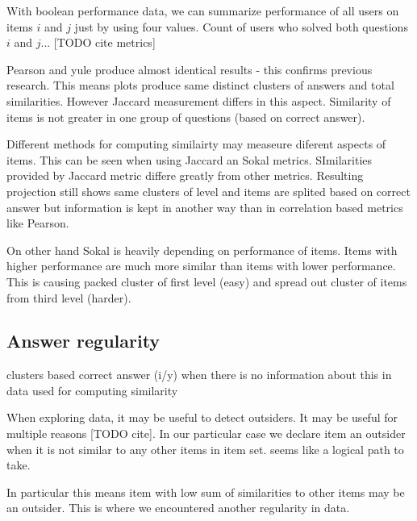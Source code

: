 \documentclass[
  digital, %
  table,   %
  nolof,     %
  nolot,     %
  nocover
]{fithesis3}
\begin{document}

With boolean performance data, we can summarize performance of all users on items $i$ and $j$ just by using four values. Count of users who solved both questions $i$ and $j$... [TODO cite metrics]

Pearson and yule produce almost identical results - this confirms
previous research. This means plots produce same distinct clusters of
answers and total similarities. However Jaccard measurement differs in
this aspect. Similarity of items is not greater in one group of
questions (based on correct answer).

Different methods for computing similairty may measeure diferent aspects
of items. This can be seen when using Jaccard an Sokal metrics.
SImilarities provided by Jaccard metric differe greatly from other
metrics. Resulting projection still shows same clusters of level and
items are splited based on correct answer but information is kept in
another way than in correlation based metrics like Pearson.

On other hand Sokal is heavily depending on performance of items. Items
with higher performance are much more similar than items with lower
performance. This is causing packed cluster of first level (easy) and
spread out cluster of items from third level (harder).


\subsection{Answer regularity}\label{answer-regularity}

clusters based correct answer (i/y) when there is no information about
this in data used for computing similarity


When exploring data, it may be useful to detect outsiders. It may be
useful for multiple reasons {[}TODO cite{]}. In our particular case we
declare item an outsider when it is not similar to any other items in
item set. seems like a logical path to take.

In particular this means item with low sum of similarities to other
items may be an outsider. This is where we encountered another
regularity in data.

\end{document}

